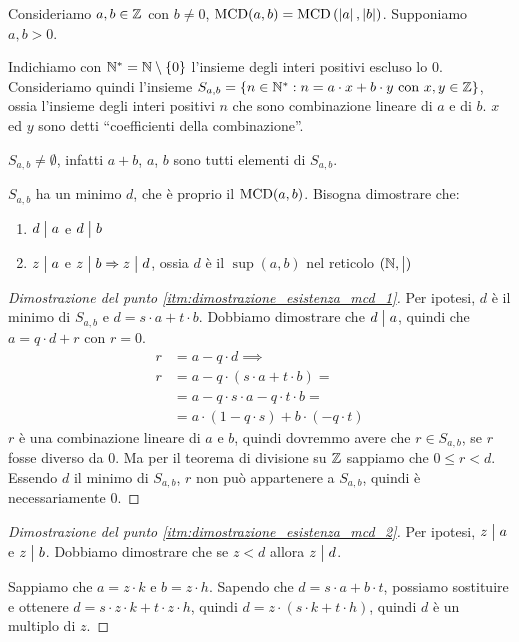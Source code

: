Consideriamo $a, b \in \mathbb{Z}$ con $b \neq 0$, $\operatorname{MCD}(a, b) = \operatorname{MCD} \left( \left\lvert{a}\right\rvert, \left\lvert{b}\right\rvert \right)$. Supponiamo $a, b > 0$.

Indichiamo con $\mathbb{N}^{\ast} = \mathbb{N} \setminus \{ 0 \}$ l'insieme degli interi positivi escluso lo 0. Consideriamo quindi l'insieme $S_{a, b} = \{ n \in \mathbb{N}^{\ast} : n = a \cdot x + b \cdot y \text{ con } x, y \in \mathbb{Z}\}$, ossia l'insieme degli interi positivi $n$ che sono combinazione lineare di $a$ e di $b$. $x$ ed $y$ sono detti ``coefficienti della combinazione''.

$S_{a, b} \neq \emptyset$, infatti $a+b$, $a$, $b$ sono tutti elementi di $S_{a,b}$.

$S_{a,b}$ ha un minimo $d$, che \`e proprio il $\operatorname{MCD}(a,b)$. Bisogna dimostrare che:
\begin{enumerate}
    \item\label{itm:dimostrazione_esistenza_mcd_1} $d \bigm| a$ e $d \bigm| b$
    \item\label{itm:dimostrazione_esistenza_mcd_2} $z \bigm| a$ e $z \bigm| b \Rightarrow z \bigm| d$, ossia $d$ \`e il $\sup(a,b)$ nel reticolo $(\mathbb{N}, \bigm|)$
\end{enumerate}
\begin{proof}[Dimostrazione del punto \ref{itm:dimostrazione_esistenza_mcd_1}]
Per ipotesi, $d$ \`e il minimo di $S_{a,b}$ e $d = s \cdot a + t \cdot b$. Dobbiamo dimostrare che $d \bigm| a$, quindi che $a = q \cdot d + r$ con $r = 0$.
\begin{align*}
r &= a - q \cdot d \implies \\
r &= a - q \cdot (s \cdot a + t \cdot b) = \\
&= a - q \cdot s \cdot a - q \cdot t \cdot b = \\
&= a \cdot (1 - q \cdot s) + b \cdot (-q \cdot t) 
\end{align*}
$r$ \`e una combinazione lineare di $a$ e $b$, quindi dovremmo avere che $r \in S_{a,b}$, se $r$ fosse diverso da 0. Ma per il teorema di divisione su $\mathbb{Z}$ sappiamo che $0 \le r < d$. Essendo $d$ il minimo di $S_{a,b}$, $r$ non pu\`o appartenere a $S_{a,b}$, quindi \`e necessariamente 0.
\end{proof}
\begin{proof}[Dimostrazione del punto \ref{itm:dimostrazione_esistenza_mcd_2}]
Per ipotesi, $z \bigm| a$ e $z \bigm| b$. Dobbiamo dimostrare che se $z < d$ allora $z \bigm| d$.

Sappiamo che $a = z \cdot k$ e $b = z \cdot h$. Sapendo che $d = s \cdot a + b \cdot t$, possiamo sostituire e ottenere $d = s \cdot z \cdot k + t \cdot z \cdot h$, quindi $d = z \cdot ( s \cdot k + t \cdot h)$, quindi $d$ \`e un multiplo di $z$.
\end{proof}

